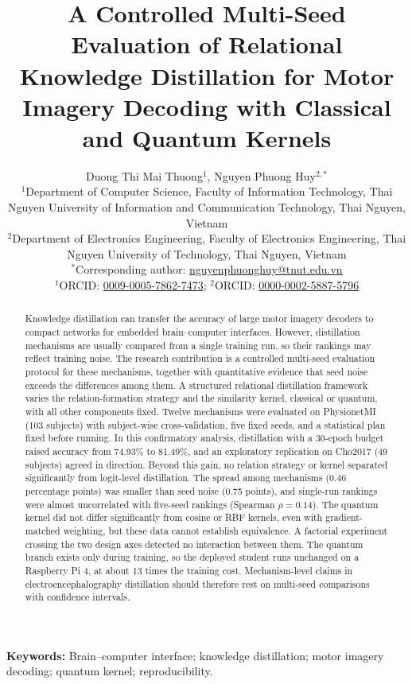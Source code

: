 \documentclass[11pt,a4paper]{article}
\title{A Controlled Multi-Seed Evaluation of Relational Knowledge Distillation for Motor Imagery Decoding with Classical and Quantum Kernels}
\author{%
Duong Thi Mai Thuong$^{1}$, Nguyen Phuong Huy$^{2,\ast}$\\[4pt]
\small $^{1}$Department of Computer Science, Faculty of Information Technology, Thai Nguyen University of Information and Communication Technology, Thai Nguyen, Vietnam\\
\small $^{2}$Department of Electronics Engineering, Faculty of Electronics Engineering, Thai Nguyen University of Technology, Thai Nguyen, Vietnam\\
\small $^{\ast}$Corresponding author: \href{mailto:nguyenphuonghuy@tnut.edu.vn}{nguyenphuonghuy@tnut.edu.vn}\\
\small $^{1}$ORCID: \href{https://orcid.org/0009-0005-7862-7473}{0009-0005-7862-7473};
$^{2}$ORCID: \href{https://orcid.org/0000-0002-5887-5796}{0000-0002-5887-5796}
}
\date{}
\begin{document}
\maketitle

\begin{abstract}
\noindent
Knowledge distillation can transfer the accuracy of large motor imagery
decoders to compact networks for embedded brain--computer interfaces.
However, distillation mechanisms are usually compared from a single
training run, so their rankings may reflect training noise. The research contribution is
a controlled multi-seed evaluation protocol for these mechanisms, together
with quantitative evidence that seed noise exceeds the differences among
them. A structured relational distillation framework varies the
relation-formation strategy and the similarity kernel, classical or
quantum, with all other components fixed. Twelve mechanisms were evaluated
on PhysionetMI (103 subjects) with subject-wise cross-validation, five fixed
seeds, and a statistical plan fixed before running. In this confirmatory
analysis, distillation with a 30-epoch budget raised accuracy from 74.93\%
to 81.49\%, and an exploratory replication on Cho2017 (49 subjects) agreed
in direction. Beyond this gain, no relation strategy or kernel separated
significantly from logit-level distillation. The spread among mechanisms
(0.46 percentage points) was smaller than seed noise (0.75 points), and
single-run rankings were almost uncorrelated with five-seed rankings
(Spearman $\rho = 0.14$). The quantum kernel did not differ significantly
from cosine or RBF kernels, even with gradient-matched weighting, but these
data cannot establish equivalence. A factorial experiment crossing the two
design axes detected no interaction between them. The quantum branch exists
only during training, so the deployed student runs unchanged on a Raspberry
Pi 4, at about 13 times the training cost. Mechanism-level claims in
electroencephalography distillation should therefore rest on multi-seed
comparisons with confidence intervals.
\end{abstract}

\noindent\textbf{Keywords:} Brain--computer interface; knowledge distillation; motor imagery decoding; quantum kernel; reproducibility.





\end{document}
